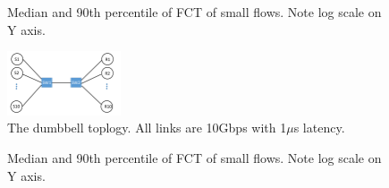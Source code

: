 \begin{figure}[t]
{\begin{minipage}{0.62\textwidth}
{\label{fig:fct_90}
}
\vspace{-1em}
\caption{Median and 90th percentile of FCT of small flows. Note log scale on Y axis.}
\vspace{-1em}
\label{fig:fct_results}
\end{minipage}
}
\end{figure}

\begin{figure}[t]
\center
\includegraphics[width=0.3\textwidth]{figures/dumbbell.pdf}
\caption{The dumbbell toplogy. All links are 10Gbps with 1$\mu$s latency.}
\label{fig:fct_topo}
\end{figure}

\begin{figure}[t]
\center
{}
\caption{Median and 90th percentile of FCT of small flows. Note log scale on Y axis.}
\label{fig:fct_results}
\end{figure}
\fi


